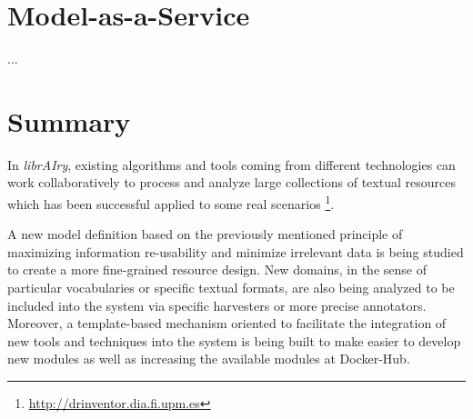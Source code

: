 \section{Model-as-a-Service}
...

\section{Summary}

In \textit{librAIry}, existing algorithms and tools coming from different technologies can work collaboratively to process and analyze large collections of textual resources which has been successful applied to some real scenarios \footnote{\url{http://drinventor.dia.fi.upm.es}}.
 
A new model definition based on the previously mentioned principle of maximizing information re-usability and minimize irrelevant data is being studied to create a more fine-grained resource design. New domains, in the sense of particular vocabularies or specific textual formats, are also being analyzed to be included into the system via specific harvesters or more precise annotators. Moreover, a template-based mechanism oriented to facilitate the integration of new tools and techniques into the system is being built to make easier to develop new modules as well as increasing the available modules at Docker-Hub.